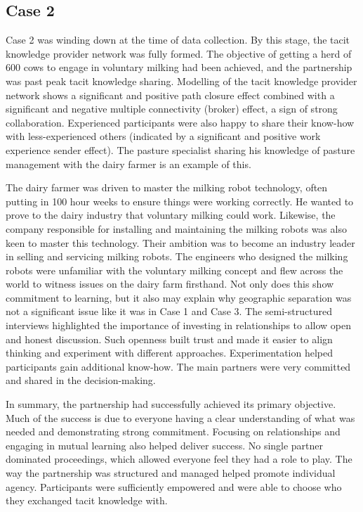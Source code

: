 \subsection{Case 2}

Case 2 was winding down at the time of data collection. By this stage, the tacit knowledge provider network was fully formed. The objective of getting a herd of 600 cows to engage in voluntary milking had been achieved, and the partnership was past peak tacit knowledge sharing. Modelling of the tacit knowledge provider network shows a significant and positive path closure effect combined with a significant and negative multiple connectivity (broker) effect, a sign of strong collaboration. Experienced participants were also happy to share their know-how with less-experienced others (indicated by a significant and positive work experience sender effect). The pasture specialist sharing his knowledge of pasture management with the dairy farmer is an example of this. \medskip

The dairy farmer was driven to master the milking robot technology, often putting in 100 hour weeks to ensure things were working correctly. He wanted to prove to the dairy industry that voluntary milking could work. Likewise, the company responsible for installing and maintaining the milking robots was also keen to master this technology. Their ambition was to become an industry leader in selling and servicing milking robots. The engineers who designed the milking robots were unfamiliar with the voluntary milking concept and flew across the world to witness issues on the dairy farm firsthand. Not only does this show commitment to learning, but it also may explain why geographic separation was not a significant issue like it was in Case 1 and Case 3. The semi-structured interviews highlighted the importance of investing in relationships to allow open and honest discussion. Such openness built trust and made it easier to align thinking and experiment with different approaches. Experimentation helped participants gain additional know-how. The main partners were very committed and shared in the decision-making. \medskip

In summary, the partnership had successfully achieved its primary objective. Much of the success is due to everyone having a clear understanding of what was needed and demonstrating strong commitment. Focusing on relationships and engaging in mutual learning also helped deliver success. No single partner dominated proceedings, which allowed everyone feel they had a role to play. The way the partnership was structured and managed helped promote individual agency. Participants were sufficiently empowered and were able to choose who they exchanged tacit knowledge with. 

